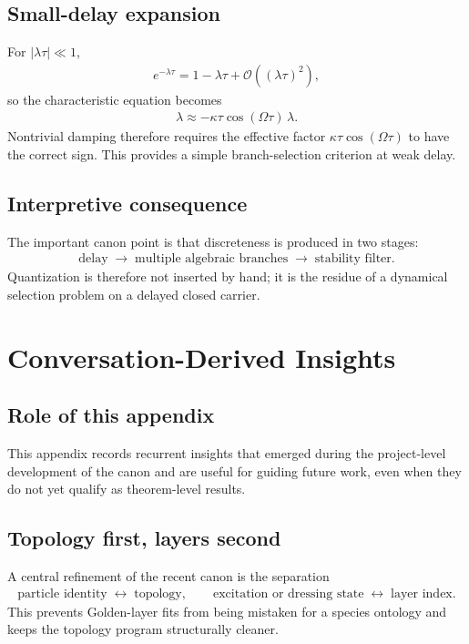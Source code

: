 \documentclass[11pt]{article}
\theoremstyle{definition}
\theoremstyle{plain}
\theoremstyle{remark}
\begin{document}
        \subsection{Small-delay expansion}
            For $|\lambda\tau|\ll 1$,
            \begin{align}
                e^{-\lambda\tau} = 1 - \lambda\tau + \mathcal{O}((\lambda\tau)^2),
            \end{align}
            so the characteristic equation becomes
            \begin{align}
                \lambda \approx -\kappa\tau\cos(\Omega\tau)\,\lambda.
            \end{align}
            Nontrivial damping therefore requires the effective factor $\kappa\tau\cos(\Omega\tau)$ to have the correct sign. This provides a simple branch-selection criterion at weak delay.

        \subsection{Interpretive consequence}
            The important canon point is that discreteness is produced in two stages:
            \begin{align}
                \text{delay} \;\longrightarrow\; \text{multiple algebraic branches} \;\longrightarrow\; \text{stability filter}.
            \end{align}
            Quantization is therefore not inserted by hand; it is the residue of a dynamical selection problem on a delayed closed carrier.

    \section{Conversation-Derived Insights}
        \label{sec:appendix_conversations}

        \subsection{Role of this appendix}
            This appendix records recurrent insights that emerged during the project-level development of the canon and are useful for guiding future work, even when they do not yet qualify as theorem-level results.

        \subsection{Topology first, layers second}
            A central refinement of the recent canon is the separation
            \begin{align}
                \text{particle identity} \;\longleftrightarrow\; \text{topology},
                \qquad
                \text{excitation or dressing state} \;\longleftrightarrow\; \text{layer index}.
            \end{align}
            This prevents Golden-layer fits from being mistaken for a species ontology and keeps the topology program structurally cleaner.
\end{document}
